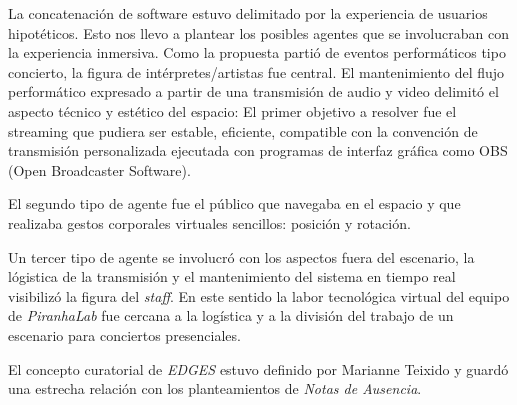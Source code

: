 La concatenación de software estuvo delimitado por la experiencia de usuarios hipotéticos. Esto nos llevo a plantear los posibles agentes que se involucraban con la experiencia inmersiva. Como la propuesta partió de eventos performáticos tipo concierto, la figura de intérpretes/artistas fue central. El mantenimiento del flujo performático expresado a partir de una transmisión de audio y video delimitó el aspecto técnico y estético del espacio: El primer objetivo a resolver fue el streaming que pudiera ser estable, eficiente, compatible con la convención de transmisión personalizada ejecutada con programas de interfaz gráfica como OBS (Open Broadcaster Software).

El segundo tipo de agente fue el público que navegaba en el espacio y que realizaba gestos corporales virtuales sencillos: posición y rotación. 

Un tercer tipo de agente se involucró con los aspectos fuera del escenario, la lógistica de la transmisión y el mantenimiento del sistema en tiempo real visibilizó la figura del \textit{staff}. En este sentido la labor tecnológica virtual del equipo de \textit{PiranhaLab} fue cercana a la logística y a la división del trabajo de un escenario para conciertos presenciales. 

El concepto curatorial de \textit{EDGES} estuvo definido por Marianne Teixido y guardó una estrecha relación con los planteamientos de \textit{Notas de Ausencia}.  %

\iffalse
- Uso de espacios tridimensionales 
- Bots y literatura 
- Datos que transforman el espacio   
- Ensayos digitales en la web
- cyberfeminisimo
- audio virtualmente posicionado 
- streaming de audio y video sin plataformas privativas - decisiones de optimización
- Según yo aquí usamos icecast y liquid soap 
- Inicios de multiplayer
\fi
